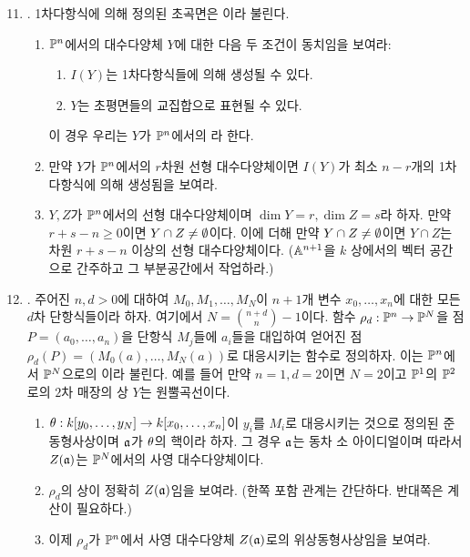 	\begin{enumerate}[label=\tb{2.\arabic*.},itemindent=0mm,itemsep=2mm]
	\setcounter{enumi}{10}
	\item {}. 1차다항식에 의해 정의된 초곡면은 이라 불린다.
	\begin{enumerate}[label=(\alph*)]
	\item $\mathbb{P}^n$에서의 대수다양체 $Y$에 대한 다음 두 조건이 동치임을 보여라:
	\begin{enumerate}[label=(\roman*)]
	\item $I(Y)$는 1차다항식들에 의해 생성될 수 있다.
	\item $Y$는 초평면들의 교집합으로 표현될 수 있다.
	\end{enumerate}
	이 경우 우리는 $Y$가 $\mathbb{P}^n$에서의 라 한다.
	\item 만약 $Y$가 $\mathbb{P}^n$에서의 $r$차원 선형 대수다양체이면
	$I(Y)$가 최소 $n-r$개의 1차다항식에 의해 생성됨을 보여라.
	\item $Y,Z$가 $\mathbb{P}^n$에서의 선형 대수다양체이며 $\dim Y=r,\dim Z=s$라 하자.
	만약 $r+s-n\ge 0$이면 $Y\cap Z\ne\emptyset$이다.
	이에 더해 만약 $Y\cap Z\ne\emptyset$이면 $Y\cap Z$는 차원 $r+s-n$ 이상의 선형 대수다양체이다.
	($\mathbb{A}^{n+1}$을 $k$ 상에서의 벡터 공간으로 간주하고 그 부분공간에서 작업하라.)
	\end{enumerate}
	\item {}. 주어진 $n,d>0$에 대하여 $M_0,M_1,\ldots,M_N$이
	$n+1$개 변수 $x_0,\ldots,x_n$에 대한 모든 $d$차 단항식들이라 하자. 여기에서 $N=\binom{n+d}{n}-1$이다.
	함수 $\rho_d:\mathbb{P}^n\rightarrow\mathbb{P}^N$을 점 $P=(a_0,\ldots,a_n)$을 단항식 $M_j$들에 $a_i$들을 대입하여 얻어진
	점 $\rho_d(P)=(M_0(a),\ldots,M_N(a))$로 대응시키는 함수로 정의하자.
	이는 $\mathbb{P}^n$에서 $\mathbb{P}^N$으로의 이라 불린다.
	예를 들어 만약 $n=1,d=2$이면 $N=2$이고 $\mathbb{P}^1$의 $\mathbb{P}^2$로의 $2$차 매장의 상 $Y$는 원뿔곡선이다.
	\begin{enumerate}[label=(\alph*)]
	\item $\theta:k[y_0,\ldots,y_N]\rightarrow k[x_0,\ldots,x_n]$이
	$y_i$를 $M_i$로 대응시키는 것으로 정의된 준동형사상이며 $\mathfrak{a}$가 $\theta$의 핵이라 하자.
	그 경우 $\mathfrak{a}$는 동차 소 아이디얼이며 따라서 $Z(\mathfrak{a})$는 $\mathbb{P}^N$에서의 사영 대수다양체이다.
	\item $\rho_d$의 상이 정확히 $Z(\mathfrak{a})$임을 보여라. (한쪽 포함 관계는 간단하다. 반대쪽은 계산이 필요하다.)
	\item 이제 $\rho_d$가 $\mathbb{P}^n$에서 사영 대수다양체 $Z(\mathfrak{a})$로의 위상동형사상임을 보여라.

\end{enumerate}
\end{enumerate}
